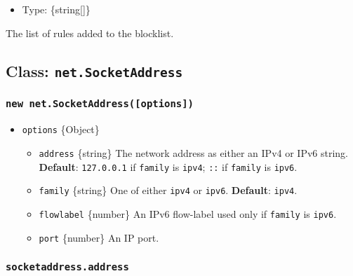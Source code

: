 \begin{itemize}
\tightlist
\item
  Type: \{string{[}{]}\}
\end{itemize}

The list of rules added to the blocklist.

\subsection{\texorpdfstring{Class:
\texttt{net.SocketAddress}}{Class: net.SocketAddress}}\label{class-net.socketaddress}

\subsubsection{\texorpdfstring{\texttt{new\ net.SocketAddress({[}options{]})}}{new net.SocketAddress({[}options{]})}}\label{new-net.socketaddressoptions}

\begin{itemize}
\tightlist
\item
  \texttt{options} \{Object\}

  \begin{itemize}
  \tightlist
  \item
    \texttt{address} \{string\} The network address as either an IPv4 or
    IPv6 string. \textbf{Default}:
    \texttt{\textquotesingle{}127.0.0.1\textquotesingle{}} if
    \texttt{family} is
    \texttt{\textquotesingle{}ipv4\textquotesingle{}};
    \texttt{\textquotesingle{}::\textquotesingle{}} if \texttt{family}
    is \texttt{\textquotesingle{}ipv6\textquotesingle{}}.
  \item
    \texttt{family} \{string\} One of either
    \texttt{\textquotesingle{}ipv4\textquotesingle{}} or
    \texttt{\textquotesingle{}ipv6\textquotesingle{}}. \textbf{Default}:
    \texttt{\textquotesingle{}ipv4\textquotesingle{}}.
  \item
    \texttt{flowlabel} \{number\} An IPv6 flow-label used only if
    \texttt{family} is
    \texttt{\textquotesingle{}ipv6\textquotesingle{}}.
  \item
    \texttt{port} \{number\} An IP port.
  \end{itemize}
\end{itemize}

\subsubsection{\texorpdfstring{\texttt{socketaddress.address}}{socketaddress.address}}\label{socketaddress.address}

